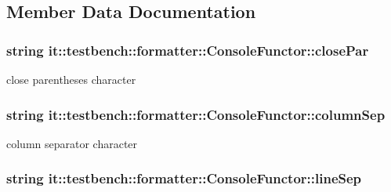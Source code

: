 \subsection{Member Data Documentation}
\hypertarget{classit_1_1testbench_1_1formatter_1_1ConsoleFunctor_aae83219f2eaf5db95fcf1356e35dd765}{
\subsubsection[{close\-Par}]{\setlength{\rightskip}{0pt plus 5cm}string it\-::testbench\-::formatter\-::\-Console\-Functor\-::close\-Par\hspace{0.3cm}{\ttfamily [private]}}}\label{d2/d36/classit_1_1testbench_1_1formatter_1_1ConsoleFunctor_aae83219f2eaf5db95fcf1356e35dd765}
close parentheses character \hypertarget{classit_1_1testbench_1_1formatter_1_1ConsoleFunctor_aa30f110e86c06bf7126e1dca275d8a2b}{
\subsubsection[{column\-Sep}]{\setlength{\rightskip}{0pt plus 5cm}string it\-::testbench\-::formatter\-::\-Console\-Functor\-::column\-Sep\hspace{0.3cm}{\ttfamily [private]}}}\label{d2/d36/classit_1_1testbench_1_1formatter_1_1ConsoleFunctor_aa30f110e86c06bf7126e1dca275d8a2b}
column separator character \hypertarget{classit_1_1testbench_1_1formatter_1_1ConsoleFunctor_ad15df0e58f3ccd2719a32aa224ae0c69}{
\subsubsection[{line\-Sep}]{\setlength{\rightskip}{0pt plus 5cm}string it\-::testbench\-::formatter\-::\-Console\-Functor\-::line\-Sep\hspace{0.3cm}{\ttfamily [private]}}}\label{d2/d36/classit_1_1testbench_1_1formatter_1_1ConsoleFunctor_ad15df0e58f3ccd2719a32aa224ae0c69}
